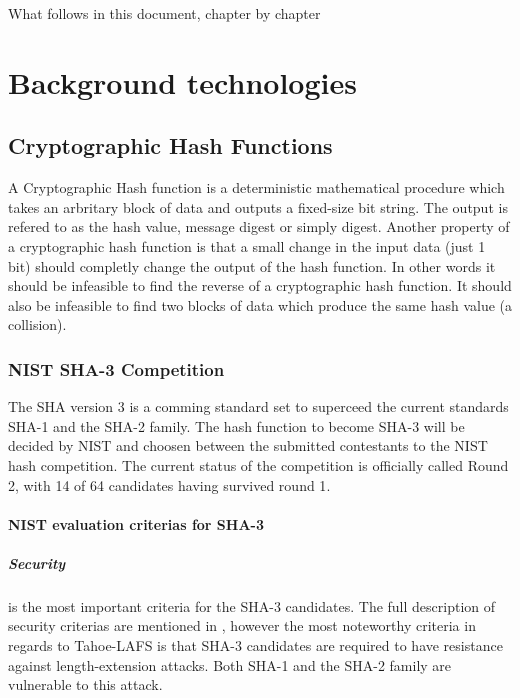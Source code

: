 \documentclass[english,12pt,a4paper]{book}
\begin{document}
What follows in this document, chapter by chapter


\chapter{Background technologies}

\section{Cryptographic Hash Functions}
A Cryptographic Hash function is a deterministic mathematical procedure which
takes an arbritary block of data and outputs a fixed-size bit string. The
output is refered to as the hash value, message digest or simply digest.
Another property of a cryptographic hash function is that a small change in the
input data (just 1 bit) should completly change the output of the hash
function. In other words it should be infeasible to find the reverse of a
cryptographic hash function. It should also be infeasible to find two blocks of
data which produce the same hash value (a collision).

\subsection{NIST SHA-3 Competition}
The \ac{SHA} version 3 is a comming standard set to superceed the current
standards \ac{SHA}-1 and the \ac{SHA}-2 family. The hash function to become
\ac{SHA}-3 will be decided by \ac{NIST} and choosen between the submitted
contestants to the \ac{NIST} hash competition. The current status of the 
competition is officially called Round 2, with 14 of 64 candidates having 
survived round 1\cite{s_fedreg}. 

\subsubsection{\ac{NIST} evaluation criterias for \ac{SHA}-3}

\paragraph{Security} is the most important criteria for the SHA-3
candidates\cite{s_nistround2}. The full description of security criterias are
mentioned in \cite{s_fedreg}, however the most noteworthy criteria in regards
to Tahoe-\ac{LAFS} is that \ac{SHA}-3 candidates are required to have
resistance against length-extension attacks. Both \ac{SHA}-1 and the \ac{SHA}-2
family are vulnerable to this attack\cite{s_mdre}.
\end{document}
